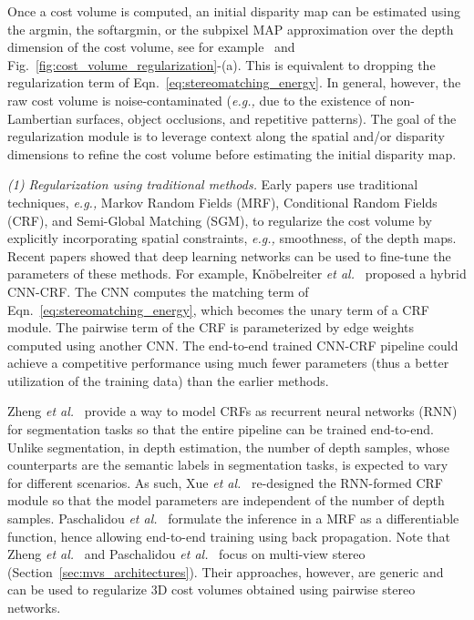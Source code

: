 \documentclass[10pt,journal,compsoc]{IEEEtran}
\newcommand{\eg}{\emph{e.g., }}
\newcommand{\etal}{\emph{et al.}}
\newcommand{\noi}{\noindent}
\begin{document}
Once a cost volume is computed, an initial disparity map can be estimated using the argmin, the softargmin, or the subpixel MAP approximation over the depth dimension of the cost volume, see for example~\cite{zhang2018activestereonet} and Fig.~\ref{fig:cost_volume_regularization}-(a). This is equivalent to dropping the regularization term of Eqn.~\eqref{eq:stereomatching_energy}.
 In general, however, the raw cost volume is noise-contaminated (\eg due to the existence of non-Lambertian surfaces, object occlusions, and repetitive patterns).   The goal of the regularization module is to leverage context along the spatial and/or disparity dimensions to refine the cost volume before estimating the initial disparity map. 

\vspace{6pt}
\noi\textit{(1) Regularization using traditional methods. } Early papers  use traditional techniques, \eg Markov Random Fields (MRF), Conditional Random Fields (CRF), and Semi-Global Matching (SGM), to regularize the cost volume by  explicitly incorporating spatial constraints, \eg smoothness, of the depth maps. Recent papers showed that deep learning networks can be used to fine-tune the parameters of these methods. For example,  Kn{\"o}belreiter \etal~\cite{knobelreiter2017end} proposed  a hybrid CNN-CRF. The CNN  computes the matching term of Eqn.~\eqref{eq:stereomatching_energy}, which becomes the unary term of a CRF module. The pairwise term of the CRF is parameterized by edge weights computed using another CNN. The  end-to-end trained  CNN-CRF  pipeline could achieve a competitive performance using much fewer parameters (thus a better utilization of the training data) than the earlier methods. 

Zheng \etal~\cite{zheng2015conditional}  provide a way to model CRFs as recurrent neural networks (RNN) for segmentation tasks so that the entire pipeline can be trained end-to-end. Unlike  segmentation, in depth estimation, the number of depth samples, whose counterparts are the semantic labels in segmentation tasks, is expected to vary for different scenarios. As such, Xue \etal~\cite{Xue_2019_ICCV} re-designed the RNN-formed CRF module so that the model parameters are independent of the number of depth samples. Paschalidou \etal~\cite{Paschalidou_2018_CVPR}  formulate the inference in a MRF as a differentiable function, hence allowing end-to-end training using back propagation.  Note that Zheng \etal~\cite{zheng2015conditional}  and  Paschalidou \etal~\cite{Paschalidou_2018_CVPR} focus on multi-view stereo (Section~\ref{sec:mvs_architectures}). Their approaches, however, are generic and can be  used to regularize 3D cost volumes obtained using pairwise stereo networks.
\end{document}
